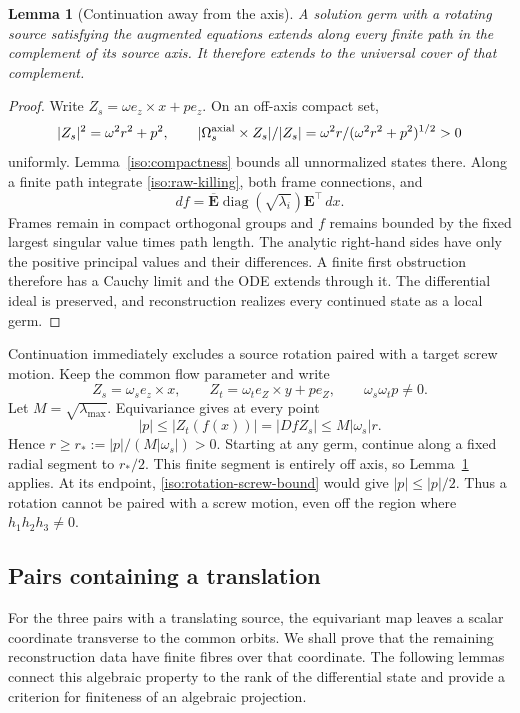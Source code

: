\documentclass[11pt,a4paper]{article}
\numberwithin{equation}{section}
\theoremstyle{plain}
\newtheorem{lemma}[theorem]{Lemma}
\theoremstyle{definition}
\theoremstyle{remark}
\begin{document}
\begin{lemma}[Continuation away from the axis]\label{iso:continuation}
A solution germ with a rotating source satisfying the augmented equations extends
along every finite path in the complement of its source axis. It therefore extends to the
universal cover of that complement.
\end{lemma}
\begin{proof}
Write $Z_s=\omega e_z\times x+pe_z$.  On an off-axis compact set,
\[
 |Z_s|^2=\omega^2r^2+p^2,\qquad
 |\Omega_s^{\rm axial}\times Z_s|/|Z_s|
 =\omega^2r/(\omega^2r^2+p^2)^{1/2}>0
\]
uniformly.  Lemma~\ref{iso:compactness} bounds all unnormalized states there.
Along a finite path integrate \eqref{iso:raw-killing}, both frame
connections, and
\[
 df=\overline{\mathbf E}\operatorname{diag}(\sqrt{\lambda_i})\mathbf E^{\top}\,dx.
\]
Frames remain in compact orthogonal groups and $f$ remains bounded by the
fixed largest singular value times path length.  The analytic right-hand
sides have only the positive principal values and their differences.  A finite first
obstruction therefore has a Cauchy limit and the ODE extends through it.
The differential ideal is preserved, and reconstruction realizes
every continued state as a local germ.
\end{proof}

Continuation immediately excludes a source rotation paired with a
target screw motion. Keep the common flow parameter and write
\[
 Z_s=\omega_s e_z\times x,\qquad
 Z_t=\omega_t e_Z\times y+pe_Z,
 \qquad \omega_s\omega_tp\ne0.
\]
Let $M=\sqrt{\lambda_{\max}}$.  Equivariance gives at every point
\begin{equation}\label{iso:rotation-screw-bound}
 |p|\le |Z_t(f(x))|=|DfZ_s|\le M|\omega_s|r.
\end{equation}
Hence $r\ge r_*:=|p|/(M|\omega_s|)>0$.
Starting at any germ, continue along a fixed radial segment to $r_*/2$.
This finite segment is entirely off axis, so
Lemma~\ref{iso:continuation} applies. At its endpoint, \eqref{iso:rotation-screw-bound}
would give $|p|\le|p|/2$.  Thus a rotation cannot be paired with a screw motion, even off the
region where $h_1h_2h_3\ne0$.  

\subsection{Pairs containing a translation}

For the three pairs with a translating source, the equivariant map
leaves a scalar coordinate transverse to the common orbits.  We shall
prove that the remaining reconstruction data have finite fibres over
that coordinate. The following lemmas connect this algebraic property
to the rank of the differential state and provide a criterion for
finiteness of an algebraic projection.
\end{document}
